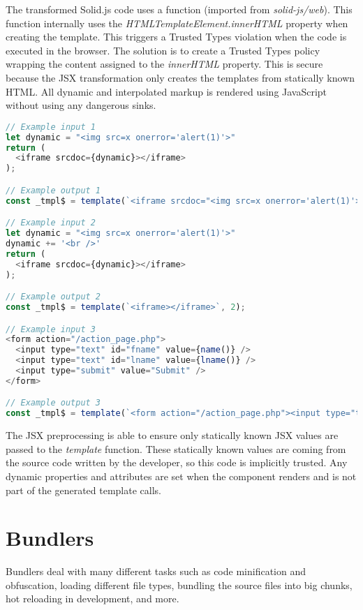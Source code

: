 The transformed Solid.js code uses a  function (imported from \emph{solid-js/web}).
This function internally uses the \emph{HTMLTemplateElement.innerHTML} property when creating the
template. This triggers a Trusted Types violation when the code is executed in the browser. The
solution is to create a Trusted Types policy wrapping the content assigned to the \emph{innerHTML}
property. This is secure because the JSX transformation only creates the templates from statically
known HTML. All dynamic and interpolated markup is rendered using JavaScript without using any
dangerous sinks.

\bigskip
\begin{lstlisting}[language=JavaScript, caption=Examples of JSX transformations]
// Example input 1
let dynamic = "<img src=x onerror='alert(1)'>"
return (
  <iframe srcdoc={dynamic}></iframe>
);

// Example output 1
const _tmpl$ = template(`<iframe srcdoc="<img src=x onerror='alert(1)'>"></iframe>`, 3);

// Example input 2
let dynamic = "<img src=x onerror='alert(1)'>"
dynamic += '<br />'
return (
  <iframe srcdoc={dynamic}></iframe>
);

// Example output 2
const _tmpl$ = template(`<iframe></iframe>`, 2);

// Example input 3
<form action="/action_page.php">
  <input type="text" id="fname" value={name()} />
  <input type="text" id="lname" value={lname()} />
  <input type="submit" value="Submit" />
</form>

// Example output 3
const _tmpl$ = template(`<form action="/action_page.php"><input type="text" id="fname"><input type="text" id="lname"><input type="submit" value="Submit"></form>`, 5);
\end{lstlisting}

The JSX preprocessing is able to ensure only statically known JSX values are passed to the
\emph{template} function. These statically known values are coming from the source code written by
the developer, so this code is implicitly trusted. Any dynamic properties and attributes are set
when the component renders and is not part of the generated template calls.

\section{Bundlers}

Bundlers deal with many different tasks such as code minification and obfuscation, loading different
file types, bundling the source files into big chunks, hot reloading in development, and more.

